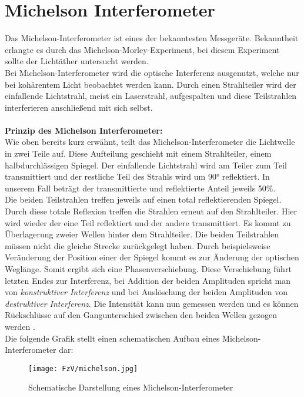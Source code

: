 \section{Michelson Interferometer}
Das Michelson-Interferometer ist eines der bekanntesten
Messgeräte. Bekanntheit erlangte es durch das Michelson-Morley-Experiment, 
bei diesem Experiment sollte der Lichtäther untersucht werden.\\
Bei Michelson-Interferometer wird die optische Interferenz ausgenutzt, welche
nur bei kohärentem Licht beobachtet werden kann. Durch 
einen Strahlteiler wird der einfallende Lichtstrahl, meist
ein Laserstrahl, aufgespalten und diese Teilstrahlen interferieren anschließend
mit sich selbst.\\\\
\textbf{Prinzip des Michelson Interferometer:}\\
Wie oben bereits kurz erwähnt, teilt das Michelson-Interferometer
die Lichtwelle in zwei Teile auf. Diese Aufteilung geschieht 
mit einem Strahlteiler, einem halbdurchlässigen Spiegel. 
Der einfallende Lichtstrahl wird am Teiler zum Teil transmittiert 
und der restliche Teil des Strahls wird um 90° reflektiert. 
In unserem Fall beträgt der transmittierte und reflektierte Anteil 
jeweils 50\%.\\
Die beiden Teilstrahlen treffen jeweils auf einen total
reflektierenden Spiegel. Durch diese totale Reflexion
treffen die Strahlen erneut auf den Strahlteiler. Hier
wird wieder der eine Teil reflektiert und der andere 
transmittiert. Es kommt zu Überlagerung zweier Wellen 
hinter dem Strahlteiler. Die beiden Teilstrahlen müssen 
nicht die gleiche Strecke zurückgelegt haben. Durch 
beispielsweise Veränderung der Position einer der Spiegel kommt es zur 
Änderung der optischen Weglänge. Somit ergibt
sich eine Phasenverschiebung. Diese Verschiebung führt letzten Endes 
zur Interferenz, bei Addition der beiden Amplituden spricht man von
\textit{konstruktiver Interferenz} und bei Auslöschung der beiden 
Amplituden von \textit{destruktiver Interferenz}. 
Die Intensität kann nun gemessen werden und es 
können Rückschlüsse auf den Gangunterschied zwischen den beiden 
Wellen gezogen werden \citep[vgl.][]{Zusatzliteratur}.\\
Die folgende Grafik stellt einen schematischen Aufbau eines 
Michelson-Interferometer dar:
\begin{figure}[h]
    \centering
    \texttt{[image: FzV/michelson.jpg]}
    \caption{Schematische Darstellung eines Michelson-Interferometer}
\end{figure}\newpage

